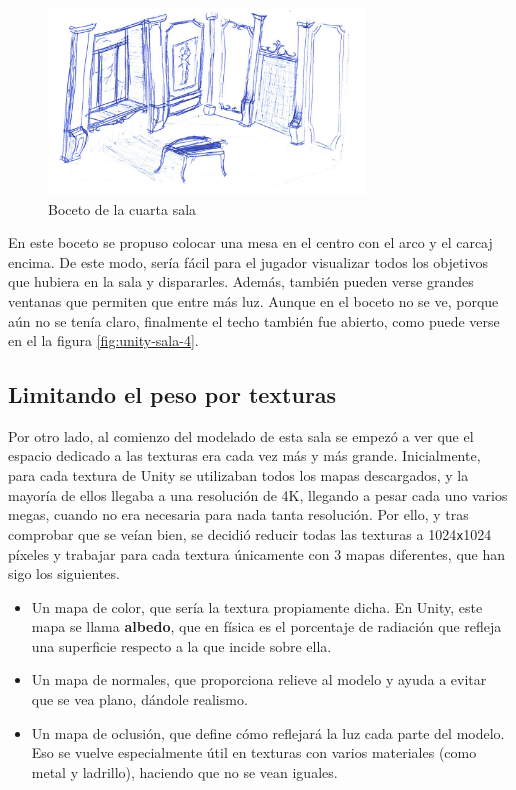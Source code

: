 \begin{figure}[!h]
\begin{center}
\includegraphics[width=0.75\textwidth]{imagenes/7/bocetos/boceto-sala-4.png}
\caption{Boceto de la cuarta sala}
\label{fig:boceto-sala-4}
\end{center}
\end{figure}

En este boceto se propuso colocar una mesa en el centro con el arco y el carcaj encima. De este modo, sería fácil para el jugador visualizar todos los objetivos que hubiera en la sala y dispararles. Además, también pueden verse grandes ventanas que permiten que entre más luz. Aunque en el boceto no se ve, porque aún no se tenía claro, finalmente el techo también fue abierto, como puede verse en el la figura \ref{fig:unity-sala-4}.

\subsection{Limitando el peso por texturas}

Por otro lado, al comienzo del modelado de esta sala se empezó a ver que el espacio dedicado a las texturas era cada vez más y más grande. Inicialmente, para cada textura de Unity se utilizaban todos los mapas descargados, y la mayoría de ellos llegaba a una resolución de 4K, llegando a pesar cada uno varios megas, cuando no era necesaria para nada tanta resolución. Por ello, y tras comprobar que se veían bien, se decidió reducir todas las texturas a 1024\texttt{x}1024 píxeles y trabajar para cada textura únicamente con 3 mapas diferentes, que han sigo los siguientes.

\begin{itemize}
    \item Un mapa de color, que sería la textura propiamente dicha. En Unity, este mapa se llama \textbf{albedo}, que en física es el porcentaje de radiación que refleja una superficie respecto a la que incide sobre ella.
    \item Un mapa de normales, que proporciona relieve al modelo y ayuda a evitar que se vea plano, dándole realismo.
    \item Un mapa de oclusión, que define cómo reflejará la luz cada parte del modelo. Eso se vuelve especialmente útil en texturas con varios materiales (como metal y ladrillo), haciendo que no se vean iguales.
\end{itemize}

